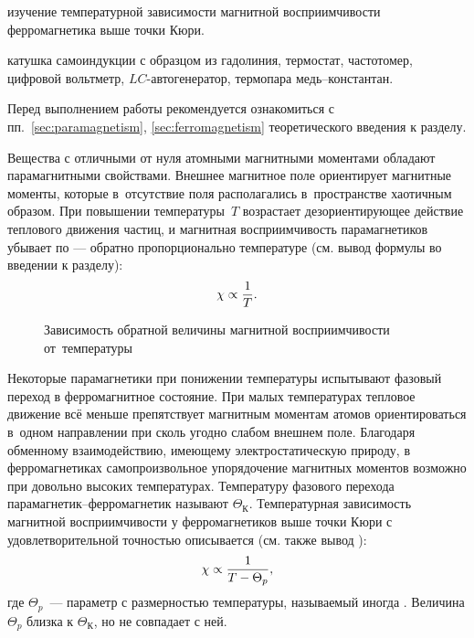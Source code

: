 
\begin{lab:aim}
изучение температурной зависимости магнитной восприимчивости ферромагнетика
выше точки Кюри.
\end{lab:aim}

\begin{lab:equipment}
катушка самоиндукции с образцом из гадолиния, термостат, частотомер,
цифровой вольтметр, $LC$-автогенератор, термопара медь--константан.
\end{lab:equipment}

Перед выполнением работы рекомендуется ознакомиться с
пп.~\ref{sec:paramagnetism}, \ref{sec:ferromagnetism} теоретического
введения к разделу.

Вещества с отличными от нуля атомными магнитными моментами обладают
парамагнитными свойствами. Внешнее магнитное поле ориентирует магнитные моменты,
которые в~отсутствие поля располагались в~пространстве хаотичным образом.
При повышении температуры~$T$ возрастает дезориентирующее действие теплового
движения частиц, и магнитная восприимчивость парамагнетиков убывает
по  --- обратно пропорционально температуре (см.
вывод формулы  во введении к разделу):
\begin{equation}%
	\chi\propto \frac{1}{T}.
	\eqmark{curi}
\end{equation}

\begin{wrapfigure}{r}{0.4\textwidth}
    \caption{Зависимость обратной величины магнитной восприимчивости
от~температуры}
\end{wrapfigure}

Некоторые парамагнетики при понижении температуры испытывают
фазовый переход в ферромагнитное состояние. При малых температурах
тепловое движение всё меньше препятствует магнитным моментам атомов
ориентироваться в~одном направлении при сколь угодно слабом внешнем поле.
Благодаря обменному взаимодействию, имеющему электростатическую природу,
в ферромагнетиках самопроизвольное упорядочение магнитных моментов
возможно при довольно высоких температурах. Температуру фазового перехода
парамагнетик--ферромагнетик называют  $\Theta_К$.
Температурная зависимость магнитной восприимчивости у ферромагнетиков
выше точки Кюри с удовлетворительной точностью
описывается  (см. также вывод
):
\begin{equation}%
    \chi\propto \frac{1}{T-\Theta_p},
    \eqmark{curi-veis}
\end{equation}
где $\Theta_p$~--- параметр с размерностью температуры, называемый
иногда . Величина $\Theta_p$ близка к
$\Theta_К$, но не совпадает с ней.

